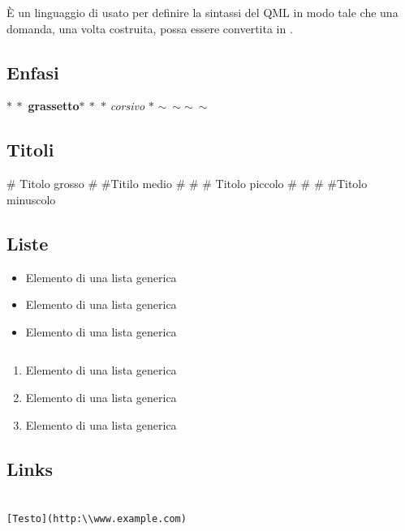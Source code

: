 \documentclass[12pt,a4paper]{article}
\begin{document}
È un linguaggio di  usato per definire la sintassi del QML in modo tale che una domanda, una volta costruita, possa essere convertita in .

\subsection{Enfasi}

$\ast\ \ast$ \textbf{grassetto}$\ast\ \ast$
\newline
$\ast$ \textit{corsivo} $\ast$
\newline
$ \sim\ \sim$$ \sim\ \sim$

\subsection{Titoli}

\# {\Large Titolo grosso}
\newline
\# \#{\normalsize Titilo medio}
\newline
\# \# \# {\small Titolo piccolo}
\newline
\# \# \# \#{\tiny Titolo minuscolo}

\subsection{Liste}
\renewcommand{\labelitemi}{$\ast$}
\begin{itemize}
	\item Elemento di una lista generica
	\item Elemento di una lista generica
	\item Elemento di una lista generica
\end{itemize}
\begin{verbatim}

\end{verbatim}
\begin{enumerate}
	\item Elemento di una lista generica
	\item Elemento di una lista generica
	\item Elemento di una lista generica
\end{enumerate}

\subsection{Links}

\begin{verbatim}

[Testo](http:\\www.example.com)

\end{verbatim}
\end{document}
